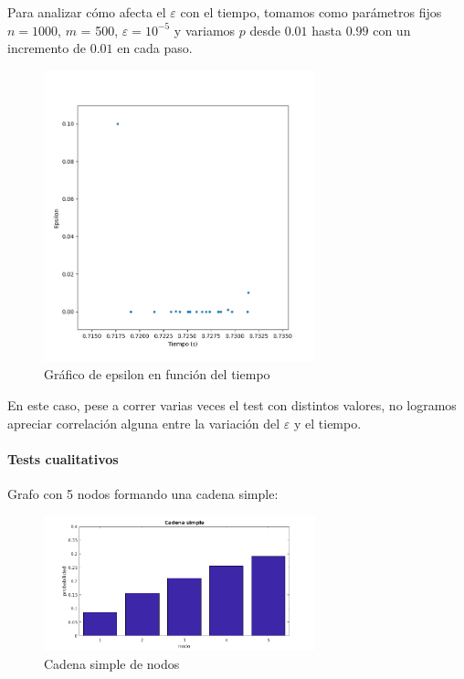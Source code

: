 Para analizar c\'omo afecta el $\varepsilon$ con el tiempo, tomamos como par\'ametros fijos $n = 1000$, $m$ = 500,
$\varepsilon = 10^{-5}$ y variamos $p$ desde $0.01$ hasta $0.99$ con un incremento de $0.01$ en cada paso.
\begin{figure}[H] 
\centering
\includegraphics[width=0.7\textwidth]{img/Eps.png}
\caption{Gr\'afico de epsilon en funci\'on del tiempo}
\label{fig:eps}
\end{figure}

En este caso, pese a correr varias veces el test con distintos valores, no logramos apreciar correlaci\'on alguna entre la variaci\'on del $\varepsilon$ y el
tiempo.

\paragraph{Tests cualitativos}


Grafo con 5 nodos formando una cadena simple:
\begin{figure}
	\centering
	\includegraphics[width=0.7\textwidth]{img/barrascadena4.png}
	\caption{Cadena simple de nodos}
	\label{fig:Ranking cadena simple}
\end{figure}



